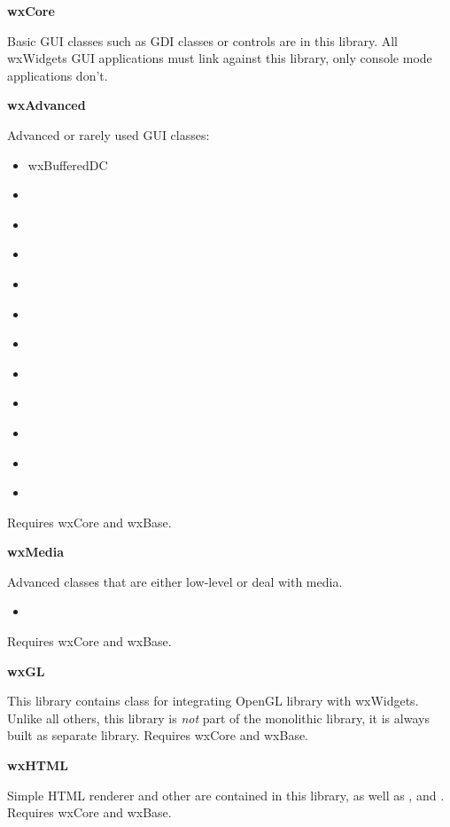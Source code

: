 {\large {\bf wxCore}}

Basic GUI classes such as GDI classes or controls are in this library. All
wxWidgets GUI applications must link against this library, only console mode
applications don't.

{\large {\bf wxAdvanced}}

Advanced or rarely used GUI classes:

\begin{itemize}\itemsep=0pt
\item{ wxBufferedDC }
\item{  }
\item{  }
\item{  }
\item{  }
\item{  }
\item{  }
\item{  }
\item{  }
\item{  }
\item{  }
\item{  }
\end{itemize}

Requires wxCore and wxBase.

{\large {\bf wxMedia}}

Advanced classes that are either low-level or deal with media.

\begin{itemize}\itemsep=0pt
\item{  }
\end{itemize}

Requires wxCore and wxBase.

{\large {\bf wxGL}}

This library contains  class for integrating
OpenGL library with wxWidgets. Unlike all others, this library is {\em not}
 part of the monolithic library, it is always built as separate library.
Requires wxCore and wxBase.

{\large {\bf wxHTML}}

Simple HTML renderer and other  are
contained in this library, as well as
 ,
  and
 . Requires wxCore and wxBase.


